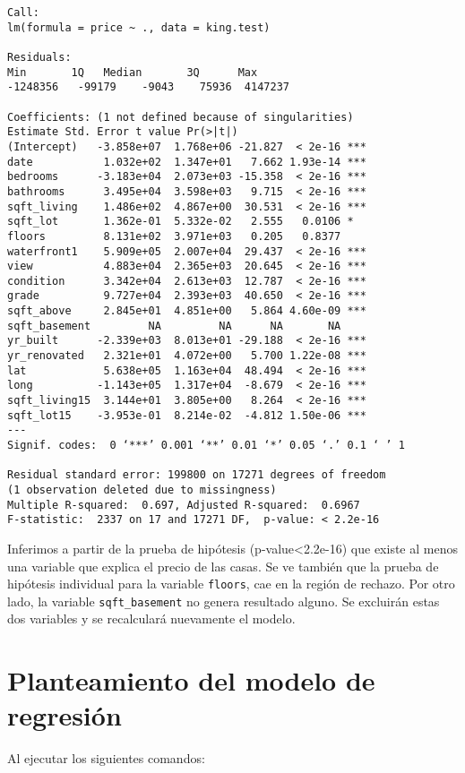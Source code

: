\documentclass[10pt,letterpaper]{article}
\begin{document}
\begin{verbatim}
Call:
lm(formula = price ~ ., data = king.test)

Residuals:
Min       1Q   Median       3Q      Max 
-1248356   -99179    -9043    75936  4147237 

Coefficients: (1 not defined because of singularities)
Estimate Std. Error t value Pr(>|t|)    
(Intercept)   -3.858e+07  1.768e+06 -21.827  < 2e-16 ***
date           1.032e+02  1.347e+01   7.662 1.93e-14 ***
bedrooms      -3.183e+04  2.073e+03 -15.358  < 2e-16 ***
bathrooms      3.495e+04  3.598e+03   9.715  < 2e-16 ***
sqft_living    1.486e+02  4.867e+00  30.531  < 2e-16 ***
sqft_lot       1.362e-01  5.332e-02   2.555   0.0106 *  
floors         8.131e+02  3.971e+03   0.205   0.8377    
waterfront1    5.909e+05  2.007e+04  29.437  < 2e-16 ***
view           4.883e+04  2.365e+03  20.645  < 2e-16 ***
condition      3.342e+04  2.613e+03  12.787  < 2e-16 ***
grade          9.727e+04  2.393e+03  40.650  < 2e-16 ***
sqft_above     2.845e+01  4.851e+00   5.864 4.60e-09 ***
sqft_basement         NA         NA      NA       NA    
yr_built      -2.339e+03  8.013e+01 -29.188  < 2e-16 ***
yr_renovated   2.321e+01  4.072e+00   5.700 1.22e-08 ***
lat            5.638e+05  1.163e+04  48.494  < 2e-16 ***
long          -1.143e+05  1.317e+04  -8.679  < 2e-16 ***
sqft_living15  3.144e+01  3.805e+00   8.264  < 2e-16 ***
sqft_lot15    -3.953e-01  8.214e-02  -4.812 1.50e-06 ***
---
Signif. codes:  0 ‘***’ 0.001 ‘**’ 0.01 ‘*’ 0.05 ‘.’ 0.1 ‘ ’ 1

Residual standard error: 199800 on 17271 degrees of freedom
(1 observation deleted due to missingness)
Multiple R-squared:  0.697,	Adjusted R-squared:  0.6967 
F-statistic:  2337 on 17 and 17271 DF,  p-value: < 2.2e-16
\end{verbatim}

Inferimos a partir de la prueba de hipótesis (p-value<2.2e-16) que existe al menos una variable que explica el precio de las casas. Se ve también que la prueba de hipótesis individual para la variable {\tt floors}, cae en la región de rechazo. Por otro lado, la variable {\tt sqft\_basement} no genera resultado alguno. Se excluirán estas dos variables y se recalculará nuevamente el modelo.

\section{Planteamiento del modelo de regresión}

Al ejecutar los siguientes comandos:
\end{document}
